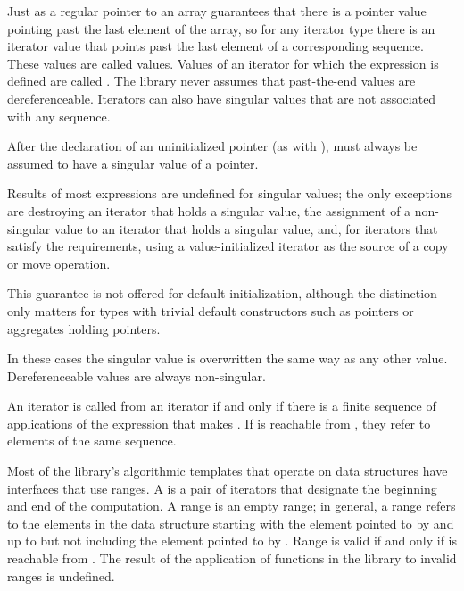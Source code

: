\pnum
Just as a regular pointer to an array guarantees that there is a pointer value pointing past the last element
of the array, so for any iterator type there is an iterator value that points past the last element of a
corresponding sequence.
These values are called
values.
Values of an iterator
for which the expression
is defined are called
.
The library never assumes that past-the-end values are dereferenceable.
Iterators can also have singular values that are not associated with any
sequence.
\begin{example}
After the declaration of an uninitialized pointer
(as with
),
must always be assumed to have a singular value of a pointer.
\end{example}
Results of most expressions are undefined for singular values;
the only exceptions are destroying an iterator that holds a singular value,
the assignment of a non-singular value to
an iterator that holds a singular value, and, for iterators that satisfy the
 requirements, using a value-initialized iterator
as the source of a copy or move operation. \begin{note} This guarantee is not
offered for default-initialization, although the distinction only matters for types
with trivial default constructors such as pointers or aggregates holding pointers.
\end{note}
In these cases the singular
value is overwritten the same way as any other value.
Dereferenceable
values are always non-singular.

\begin{removedblock}
\pnum
An iterator
is called
from an iterator
if and only if there is a finite sequence of applications of
the expression
that makes
.
If
is reachable from
,
they refer to elements of the same sequence.

\pnum
Most of the library's algorithmic templates that operate on data structures have interfaces that use ranges.
A
is a pair of iterators that designate the beginning and end of the computation.
A range 
is an empty range;
in general, a range 
refers to the elements in the data structure starting with the element
pointed to by
and up to but not including the element pointed to by
.
Range 
is valid if and only if
is reachable from
.
The result of the application of functions in the library to invalid ranges is
undefined.
\end{removedblock}

